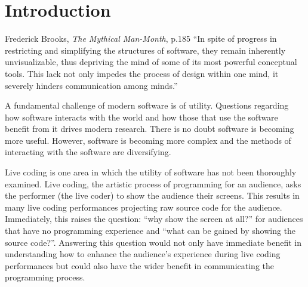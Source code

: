 
\chapter{Introduction}
\label{chap:introduction}

\begin{chapquote}{Frederick Brooks, \textit{The Mythical Man-Month}, p.185}
``In spite of progress in restricting and simplifying the structures of software, they remain inherently unvisualizable, thus depriving the mind of some of its most powerful conceptual tools. This lack not only impedes the process of design within one mind, it severely hinders communication among minds.''
\end{chapquote}


A fundamental challenge of modern software is of utility. Questions regarding how software interacts with the world and how those that use the software benefit from it drives modern research. There is no doubt software is becoming more useful. However, software is becoming more complex and the methods of interacting with the software are diversifying.

Live coding is one area in which the utility of software has not been thoroughly examined. Live coding, the artistic process of programming for an audience, asks the performer (the live coder) to show the audience their screens. This results in many live coding performances projecting raw source code for the audience. Immediately, this raises the question: ``why show the screen at all?'' for audiences that have no programming experience and ``what can be gained by showing the source code?''. Answering this question would not only have immediate benefit in understanding how to enhance the audience's experience during live coding performances but could also have the wider benefit in communicating the programming process.








